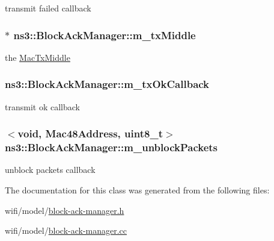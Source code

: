 transmit failed callback 

\subsubsection[{\texorpdfstring{m\+\_\+tx\+Middle}{m_txMiddle}}]{$\ast$ ns3\+::\+Block\+Ack\+Manager\+::m\+\_\+tx\+Middle\hspace{0.3cm}{\ttfamily [private]}}\hypertarget{classns3_1_1BlockAckManager_a3c78348cca01da647d813f90d2463a44}{}\label{classns3_1_1BlockAckManager_a3c78348cca01da647d813f90d2463a44}


the \hyperlink{classns3_1_1MacTxMiddle}{Mac\+Tx\+Middle} 

\subsubsection[{\texorpdfstring{m\+\_\+tx\+Ok\+Callback}{m_txOkCallback}}]{ ns3\+::\+Block\+Ack\+Manager\+::m\+\_\+tx\+Ok\+Callback\hspace{0.3cm}{\ttfamily [private]}}\hypertarget{classns3_1_1BlockAckManager_ace96f46b7c52c441becc70227b70d070}{}\label{classns3_1_1BlockAckManager_ace96f46b7c52c441becc70227b70d070}


transmit ok callback 

\subsubsection[{\texorpdfstring{m\+\_\+unblock\+Packets}{m_unblockPackets}}]{$<$void, {\bf Mac48\+Address}, uint8\+\_\+t$>$ ns3\+::\+Block\+Ack\+Manager\+::m\+\_\+unblock\+Packets\hspace{0.3cm}{\ttfamily [private]}}\hypertarget{classns3_1_1BlockAckManager_a1ac5899b37bf2ffee1814cefebe8fe29}{}\label{classns3_1_1BlockAckManager_a1ac5899b37bf2ffee1814cefebe8fe29}


unblock packets callback 



The documentation for this class was generated from the following files\+:\begin{DoxyCompactItemize}
\item 
wifi/model/\hyperlink{block-ack-manager_8h}{block-\/ack-\/manager.\+h}\item 
wifi/model/\hyperlink{block-ack-manager_8cc}{block-\/ack-\/manager.\+cc}\end{DoxyCompactItemize}
